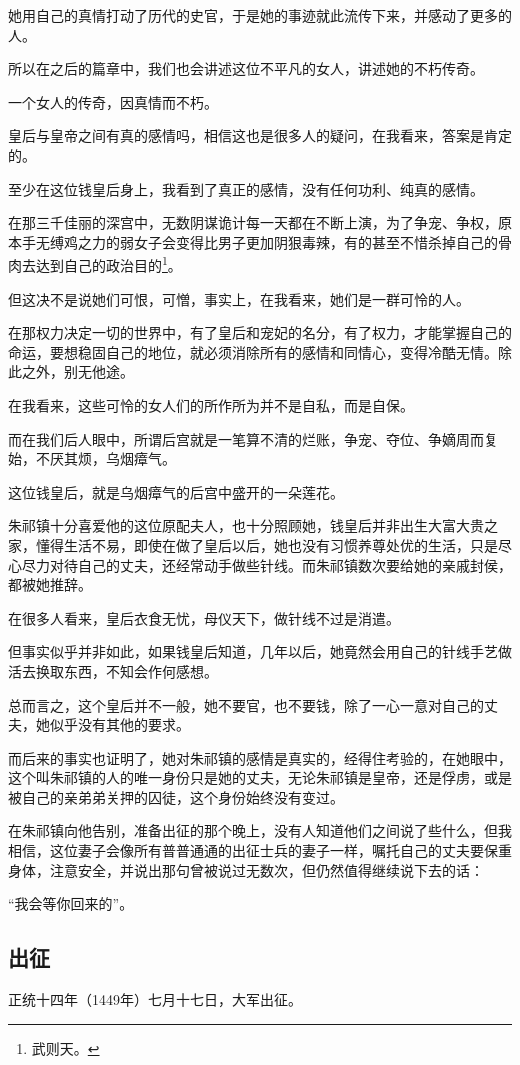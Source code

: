 \begin{multicols}{\theparacolNo}
她用自己的真情打动了历代的史官，于是她的事迹就此流传下来，并感动了更多的人。

所以在之后的篇章中，我们也会讲述这位不平凡的女人，讲述她的不朽传奇。

一个女人的传奇，因真情而不朽。

皇后与皇帝之间有真的感情吗，相信这也是很多人的疑问，在我看来，答案是肯定的。

至少在这位钱皇后身上，我看到了真正的感情，没有任何功利、纯真的感情。

在那三千佳丽的深宫中，无数阴谋诡计每一天都在不断上演，为了争宠、争权，原本手无缚鸡之力的弱女子会变得比男子更加阴狠毒辣，有的甚至不惜杀掉自己的骨肉去达到自己的政治目的\footnote{武则天。}。

但这决不是说她们可恨，可憎，事实上，在我看来，她们是一群可怜的人。

在那权力决定一切的世界中，有了皇后和宠妃的名分，有了权力，才能掌握自己的命运，要想稳固自己的地位，就必须消除所有的感情和同情心，变得冷酷无情。除此之外，别无他途。

在我看来，这些可怜的女人们的所作所为并不是自私，而是自保。

而在我们后人眼中，所谓后宫就是一笔算不清的烂账，争宠、夺位、争嫡周而复始，不厌其烦，乌烟瘴气。

这位钱皇后，就是乌烟瘴气的后宫中盛开的一朵莲花。

朱祁镇十分喜爱他的这位原配夫人，也十分照顾她，钱皇后并非出生大富大贵之家，懂得生活不易，即使在做了皇后以后，她也没有习惯养尊处优的生活，只是尽心尽力对待自己的丈夫，还经常动手做些针线。而朱祁镇数次要给她的亲戚封侯，都被她推辞。

在很多人看来，皇后衣食无忧，母仪天下，做针线不过是消遣。

但事实似乎并非如此，如果钱皇后知道，几年以后，她竟然会用自己的针线手艺做活去换取东西，不知会作何感想。

总而言之，这个皇后并不一般，她不要官，也不要钱，除了一心一意对自己的丈夫，她似乎没有其他的要求。

而后来的事实也证明了，她对朱祁镇的感情是真实的，经得住考验的，在她眼中，这个叫朱祁镇的人的唯一身份只是她的丈夫，无论朱祁镇是皇帝，还是俘虏，或是被自己的亲弟弟关押的囚徒，这个身份始终没有变过。

在朱祁镇向他告别，准备出征的那个晚上，没有人知道他们之间说了些什么，但我相信，这位妻子会像所有普普通通的出征士兵的妻子一样，嘱托自己的丈夫要保重身体，注意安全，并说出那句曾被说过无数次，但仍然值得继续说下去的话：

“我会等你回来的”。

\subsection{出征}
正统十四年（1449年）七月十七日，大军出征。


\end{multicols}
